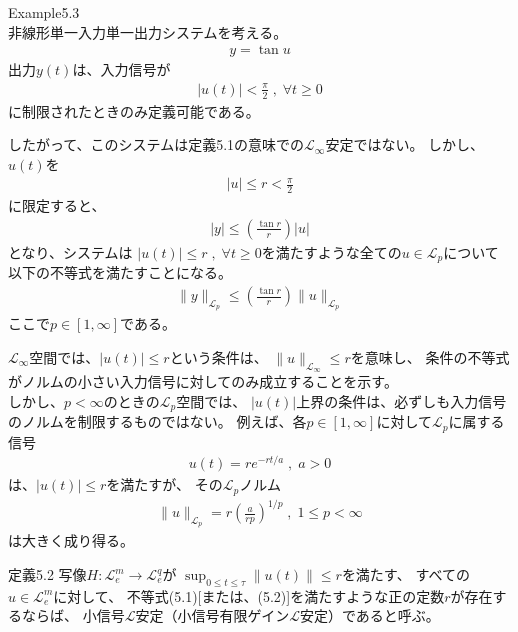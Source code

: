 \documentclass{jsarticle}
\begin{document}
{\color{gray}\hrulefill}

Example5.3\\
非線形単一入力単一出力システムを考える。
\begin{align}
  y = \tan u
\end{align}
出力$y(t)$は、入力信号が
\begin{align}
  |u(t)|<\frac{\pi}{2}\;,\;\forall t\geq 0
\end{align}
に制限されたときのみ定義可能である。

したがって、このシステムは定義5.1の意味での$\mathcal L_\infty$安定ではない。
しかし、$u(t)$を
\begin{align}
  |u|\leq r < \frac{\pi}{2}
\end{align}
に限定すると、
\begin{align}
  |y| \leq \left(\frac{\tan r}{r}\right)|u|
\end{align}
となり、システムは
$|u(t)|\leq r \;,\;\forall t\geq 0$を満たすような全ての$u\in \mathcal L_p$について
以下の不等式を満たすことになる。
\begin{align}
  \|y\|_{\mathcal L_p} \leq \left(\frac{\tan r}{r}\right)\|u\|_{\mathcal L_p}
\end{align}
ここで$p\in [1,\infty]$である。

$\mathcal L_\infty$空間では、$|u(t)|\leq r$という条件は、
$\|u\|_{\mathcal L_\infty}\leq r$を意味し、
条件の不等式がノルムの小さい入力信号に対してのみ成立することを示す。\\
しかし、$p<\infty$のときの$\mathcal L_p$空間では、
$|u(t)|$上界の条件は、必ずしも入力信号のノルムを制限するものではない。
例えば、各$p \in [1,\infty]$に対して$\mathcal L_p$に属する信号
\begin{align}
  u(t) = re^{-rt/a}\;,\;a>0
\end{align}
は、$|u(t)|\leq r$を満たすが、
その$\mathcal L_p$ノルム
\begin{align}
  \|u\|_{\mathcal L_p} = r\left(\frac{a}{rp}\right)^{1/p}\;,\;1\leq p <\infty
\end{align}
は大きく成り得る。

{\color{gray}\hrulefill}

\begin{itembox}[l]{定義5.2}
  写像$H \colon \mathcal L^m_e \rightarrow \mathcal L^q_e$が
  $\sup_{0\leq t\leq \tau} \|u(t)\|\leq r$を満たす、
  すべての$u \in \mathcal L^m_e$に対して、
  不等式(5.1)[または、(5.2)]を満たすような正の定数$r$が存在するならば、
  小信号$\mathcal L$安定（小信号有限ゲイン$\mathcal L$安定）であると呼ぶ。
\end{itembox}
\end{document}
